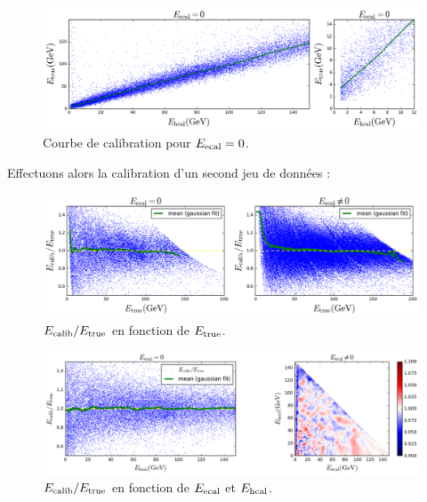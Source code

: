 \documentclass[11pt,a4paper]{article}
\begin{document}
\begin{figure}[!h]
\begin{center}
\includegraphics[width=\textwidth]{images/pictures/testKNNGC/KNNGaussianCleaning_calibration.png}
\caption{Courbe de calibration pour $E_{\rm ecal} = 0$.}
\end{center}
\end{figure}

Effectuons alors la calibration d'un second jeu de données : 
\begin{figure}[!h]
\begin{center}
\includegraphics[width=\textwidth]{images/pictures/testKNNGC/KNNGaussianCleaning_ecalib_over_etrue.png}
\caption{$E_{\rm calib}/E_{\rm true}$ en fonction de $E_{\rm true}$.}
\label{ecaliboveretrueKNNGC}
\end{center}
\end{figure}

\begin{figure}[!h]
\begin{center}
\includegraphics[width=\textwidth]{images/pictures/testKNNGC/KNNGaussianCleaning_ecalib_over_etrue_functionof_ecal_hcal.png}
\caption{$E_{\rm calib}/E_{\rm true}$ en fonction de $E_{\rm ecal}$ et $E_{\rm hcal}$.}
\label{ecaliboveretrueKNNGC_ecal_hcal}
\end{center}
\end{figure}
\end{document}
